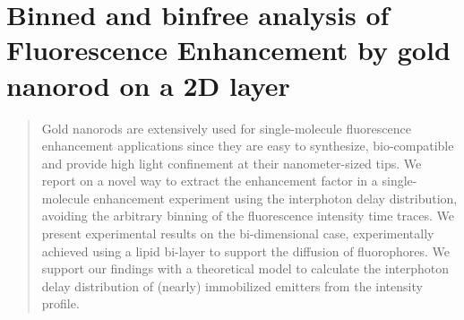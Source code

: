 \chapter{Binned and binfree analysis of Fluorescence Enhancement by gold nanorod on a 2D layer}
\label{chapter:binfree}
\graphicspath{{./chapters/c3_binfree/img/}}


\begin{abstract}
Gold nanorods are extensively used for single-molecule fluorescence enhancement applications since they are easy to synthesize, bio-compatible and provide high light confinement at their nanometer-sized tips. We report on a novel way to extract the enhancement factor in a single-molecule enhancement experiment using the interphoton delay distribution, avoiding the arbitrary binning of the fluorescence intensity time traces. We present experimental results on the bi-dimensional case, experimentally achieved using a lipid bi-layer to support the diffusion of fluorophores.  We support our findings with a theoretical model to calculate the interphoton delay distribution of (nearly) immobilized emitters from the intensity profile.
\end{abstract}
\newpage







